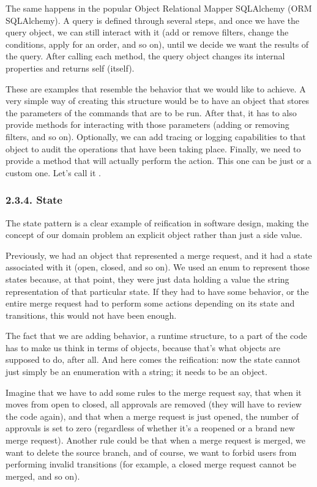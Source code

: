 \documentclass[a4paper,10pt,english]{sphinxmanual}
\begin{document}
The same happens in the popular Object Relational Mapper SQLAlchemy
(ORM SQLAlchemy). A query is defined through several steps, and once we have the
query object, we can still interact with it (add or remove filters, change the conditions,
apply for an order, and so on), until we decide we want the results of the query. After
calling each method, the query object changes its internal properties and returns self
(itself).

These are examples that resemble the behavior that we would like to achieve. A very
simple way of creating this structure would be to have an object that stores the parameters
of the commands that are to be run. After that, it has to also provide methods for
interacting with those parameters (adding or removing filters, and so on). Optionally, we
can add tracing or logging capabilities to that object to audit the operations that have been
taking place. Finally, we need to provide a method that will actually perform the action.
This one can be just  or a custom one. Let’s call it .


\subsubsection{2.3.4. State}
\label{\detokenize{chapters/9_design_patterns/index:state}}
The state pattern is a clear example of reification in software design, making the concept of
our domain problem an explicit object rather than just a side value.

Previously, we had an object that represented a merge
request, and it had a state associated with it (open, closed, and so on). We used an enum to
represent those states because, at that point, they were just data holding a value the string
representation of that particular state. If they had to have some behavior, or the entire
merge request had to perform some actions depending on its state and transitions, this
would not have been enough.

The fact that we are adding behavior, a runtime structure, to a part of the code has to make
us think in terms of objects, because that’s what objects are supposed to do, after all. And
here comes the reification: now the state cannot just simply be an enumeration with a
string; it needs to be an object.

Imagine that we have to add some rules to the merge request say, that when it moves from
open to closed, all approvals are removed (they will have to review the code again), and
that when a merge request is just opened, the number of approvals is set to zero (regardless
of whether it’s a reopened or a brand new merge request). Another rule could be that when
a merge request is merged, we want to delete the source branch, and of course, we want to
forbid users from performing invalid transitions (for example, a closed merge request
cannot be merged, and so on).
\end{document}
